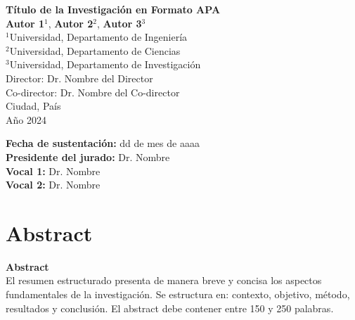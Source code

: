 \documentclass[12pt, a4paper, oneside]{article}
\begin{document}
\begin{titlepage}
\centering
\vspace*{0.5in}
{\large\bfseries Título de la Investigación en Formato APA}\\[0.5in]
\vfill
\textbf{Autor 1}$^{1}$, \textbf{Autor 2}$^{2}$, \textbf{Autor 3}$^{3}$\\[0.3in]
$^{1}$Universidad, Departamento de Ingeniería\\
$^{2}$Universidad, Departamento de Ciencias\\
$^{3}$Universidad, Departamento de Investigación\\[0.5in]
{\small Director: Dr. Nombre del Director}\\[0.3in]
{\small Co-director: Dr. Nombre del Co-director}\\[0.5in]
{\small Ciudad, País}\\
{\small Año 2024}
\end{titlepage}

\newpage
\thispagestyle{empty}
\vspace*{2in}
\begin{flushright}
\begin{minipage}{4in}
\small
\textbf{Fecha de sustentación:} dd de mes de aaaa\\[0.3in]
\textbf{Presidente del jurado:} Dr. Nombre\\[0.3in]
\textbf{Vocal 1:} Dr. Nombre\\[0.3in]
\textbf{Vocal 2:} Dr. Nombre\\[0.3in]
\end{minipage}
\end{flushright}

\newpage
\section*{Abstract}
{\centering\textbf{Abstract}\\[0.2in]}
\doublespacing
El resumen estructurado presenta de manera breve y concisa los aspectos
fundamentales de la investigación. Se estructura en: contexto, objetivo,
método, resultados y conclusión. El abstract debe contener entre 150 y 250
palabras.
\end{document}
